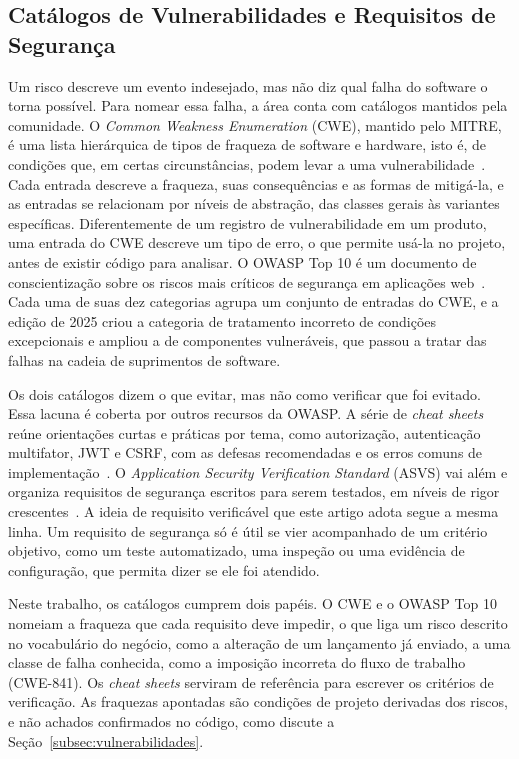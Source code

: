 \documentclass[conference]{IEEEtran}
\begin{document}
\subsection{Catálogos de Vulnerabilidades e Requisitos de Segurança}

Um risco descreve um evento indesejado, mas não diz qual falha do software o torna possível. Para nomear essa falha, a área conta com catálogos mantidos pela comunidade. O \textit{Common Weakness Enumeration} (CWE), mantido pelo MITRE, é uma lista hierárquica de tipos de fraqueza de software e hardware, isto é, de condições que, em certas circunstâncias, podem levar a uma vulnerabilidade~\cite{mitrecwe}. Cada entrada descreve a fraqueza, suas consequências e as formas de mitigá-la, e as entradas se relacionam por níveis de abstração, das classes gerais às variantes específicas. Diferentemente de um registro de vulnerabilidade em um produto, uma entrada do CWE descreve um tipo de erro, o que permite usá-la no projeto, antes de existir código para analisar. O OWASP Top 10 é um documento de conscientização sobre os riscos mais críticos de segurança em aplicações web~\cite{owasp2025top10}. Cada uma de suas dez categorias agrupa um conjunto de entradas do CWE, e a edição de 2025 criou a categoria de tratamento incorreto de condições excepcionais e ampliou a de componentes vulneráveis, que passou a tratar das falhas na cadeia de suprimentos de software.

Os dois catálogos dizem o que evitar, mas não como verificar que foi evitado. Essa lacuna é coberta por outros recursos da OWASP. A série de \textit{cheat sheets} reúne orientações curtas e práticas por tema, como autorização, autenticação multifator, JWT e CSRF, com as defesas recomendadas e os erros comuns de implementação~\cite{owaspcheatsheets}. O \textit{Application Security Verification Standard} (ASVS) vai além e organiza requisitos de segurança escritos para serem testados, em níveis de rigor crescentes~\cite{owaspasvs2025}. A ideia de requisito verificável que este artigo adota segue a mesma linha. Um requisito de segurança só é útil se vier acompanhado de um critério objetivo, como um teste automatizado, uma inspeção ou uma evidência de configuração, que permita dizer se ele foi atendido.

Neste trabalho, os catálogos cumprem dois papéis. O CWE e o OWASP Top 10 nomeiam a fraqueza que cada requisito deve impedir, o que liga um risco descrito no vocabulário do negócio, como a alteração de um lançamento já enviado, a uma classe de falha conhecida, como a imposição incorreta do fluxo de trabalho (CWE-841). Os \textit{cheat sheets} serviram de referência para escrever os critérios de verificação. As fraquezas apontadas são condições de projeto derivadas dos riscos, e não achados confirmados no código, como discute a Seção~\ref{subsec:vulnerabilidades}.
\end{document}
